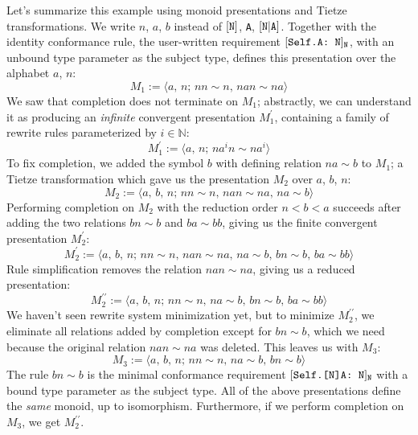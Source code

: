 \documentclass[../generics]{subfiles}
\begin{document}
\begin{example}
Let's summarize this example using monoid presentations and Tietze transformations. We write $n$, $a$, $b$ instead of $[\texttt{N}]$, \texttt{A}, $[\texttt{N}|\texttt{A}]$. Together with the identity conformance rule, the user-written requirement $[\texttt{Self.A:~N}]_\texttt{N}$, with an unbound type parameter as the subject type, defines this presentation over the alphabet $a$, $n$:
\[M_1 := \langle a,\,n;\,nn\sim n,\,nan\sim na\rangle\]
We saw that completion does not terminate on $M_1$; abstractly, we can understand it as producing an \emph{infinite} convergent presentation $M_1^\prime$, containing a family of rewrite rules parameterized by $i\in\mathbb{N}$:
\[M_1^\prime := \langle a,\,n;\,na^in\sim na^i\rangle\]
To fix completion, we added the symbol $b$ with defining relation $na\sim b$ to $M_1$; a Tietze transformation which gave us the presentation $M_2$ over $a$, $b$, $n$:
\[M_2 := \langle a,\,b,\,n;\,nn\sim n,\,nan\sim na,\,na\sim b\rangle\]
Performing completion on $M_2$ with the reduction order $n<b<a$ succeeds after adding the two relations $bn\sim b$ and $ba\sim bb$, giving us the finite convergent presentation $M_2^\prime$:
\[M_2^\prime := \langle a,\,b,\,n;\,nn\sim n,\,nan\sim na,\,na\sim b,\,bn\sim b,\,ba\sim bb\rangle\]
Rule simplification removes the relation $nan\sim na$, giving us a reduced presentation:
\[M_2^{\prime\prime} := \langle a,\,b,\,n;\,nn\sim n,\,na\sim b,\,bn\sim b,\,ba\sim bb\rangle\]
We haven't seen rewrite system minimization yet, but to minimize $M_2^{\prime\prime}$, we eliminate all relations added by completion except for $bn\sim b$, which we need because the original relation $nan\sim na$ was deleted. This leaves us with $M_3$:
\[M_3:=\langle a,\,b,\,n;\,nn\sim n,\,na\sim b,\,bn\sim b\rangle\]
The rule $bn\sim b$ is the minimal conformance requirement $[\texttt{Self.[N]A:~N}]_\texttt{N}$ with a bound type parameter as the subject type. All of the above presentations define the \emph{same} monoid, up to isomorphism. Furthermore, if we perform completion on $M_3$, we get $M_2^{\prime\prime}$.
\end{example}
\end{document}

